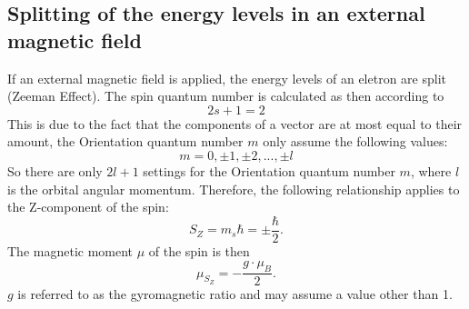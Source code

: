 \subsection{Splitting of the energy levels in an external magnetic field}
If an external magnetic field is applied, the energy levels of an eletron are split (Zeeman Effect).
The spin quantum number is calculated as
then according to
\begin{equation}
  2s+1=2
\end{equation}
This is due to the fact that the components of a vector are at most equal to their
amount, the Orientation quantum number $m$ only assume the following values:
\begin{equation}
  m=0,\pm1,\pm2,...,\pm l
\end{equation}
So there are only $2l+1$ settings for the Orientation quantum number $m$, where $l$ is the orbital angular momentum.
Therefore, the following relationship applies to the Z-component of the spin:
\begin{equation}
  S_Z=m_s\hbar=\pm\frac{\hbar}{2}.
\end{equation}
The magnetic moment $\mu$ of the spin is then
\begin{equation}
  \mu_{S_Z}=-\frac{g\cdot\mu_B}{2}.
\end{equation}
$g$ is referred to as the gyromagnetic ratio and may assume a value other than 1.
